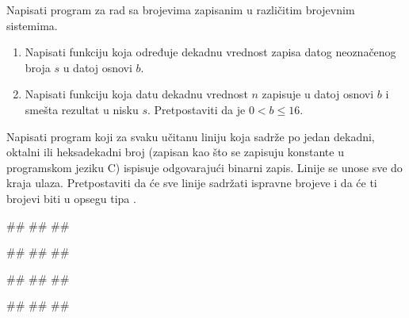 \begin{Exercise}[label=p2.3_] 
Napisati program za rad sa brojevima zapisanim u različitim brojevnim sistemima.
\begin{enumerate}
\item Napisati funkciju  koja
određuje dekadnu vrednost zapisa datog neoznačenog broja $s$ u datoj
osnovi $b$. 
\item Napisati funkciju
 koja datu
dekadnu vrednost $n$ zapisuje u datoj osnovi $b$ i smešta
rezultat u nisku $s$. Pretpostaviti da je $0 < b \leq 16$.  
 \end{enumerate}
Napisati program koji za svaku učitanu liniju koja sadrže po jedan dekadni, oktalni ili
heksadekadni broj (zapisan kao što se zapisuju konstante u programskom
jeziku C) ispisuje odgovarajući binarni zapis. 
Linije se unose sve do kraja ulaza.
Pretpostaviti da će sve linije sadržati ispravne brojeve i da će ti brojevi biti u opsegu tipa
. 


\begin{miditest}
\begin{upotreba}{1}
#\naslovInt#
##
##
\end{upotreba}
\end{miditest}
\begin{miditest}
\begin{upotreba}{2}
#\naslovInt#
##
##
\end{upotreba}
\end{miditest}

\begin{miditest}
\begin{upotreba}{3}
#\naslovInt#
##
##
\end{upotreba}
\end{miditest}
\begin{miditest}
\begin{upotreba}{4}
#\naslovInt#
##
##
\end{upotreba}
\end{miditest}
\end{Exercise}
\ifresenja
\begin{Answer}[ref=p2.3_]
\end{Answer}
\fi


